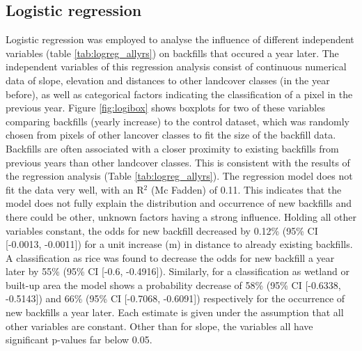 \documentclass[11pt, letterpaper, oneside]{article}
\begin{document}
\subsection{Logistic regression} 
Logistic regression was employed to analyse the influence of different independent variables (table \ref{tab:logreg_allyrs}) on backfills that occured a year later. The independent variables of this regression analysis consist of continuous numerical data of slope, elevation and distances to other landcover classes (in the year before), as well as categorical factors indicating the classification of a pixel in the previous year.  
Figure \ref{fig:logibox} shows boxplots for two of these variables comparing backfills (yearly increase) to the control dataset, which was randomly chosen from pixels of other lancover classes to fit the size of the backfill data. Backfills are often associated with a closer proximity to existing backfills from previous years than other landcover classes.
This is consistent with the results of the regression analysis (Table \ref{tab:logreg_allyrs}). The regression model does not fit the data very well, with an R$^2$ (Mc Fadden) of 0.11. This indicates that the model does not fully explain  the distribution and occurrence of new backfills and there could be other, unknown factors having a strong influence. Holding all other variables constant, the odds for new backfill decreased by 0.12\% (95\% CI [-0.0013, -0.0011]) for a unit increase (m) in distance to already existing backfills. A classification as rice was found to decrease the odds for new backfill a year later by 55\% (95\% CI [-0.6, -0.4916]). Similarly, for a classification as wetland or built-up area the model shows a probability decrease of 58\% (95\% CI [-0.6338, -0.5143]) and 66\% (95\% CI [-0.7068, -0.6091]) respectively for the occurrence of new backfills a year later. Each estimate is given under the assumption that all other variables are constant. Other than for slope, the variables all have significant p-values far below 0.05.
\end{document}
